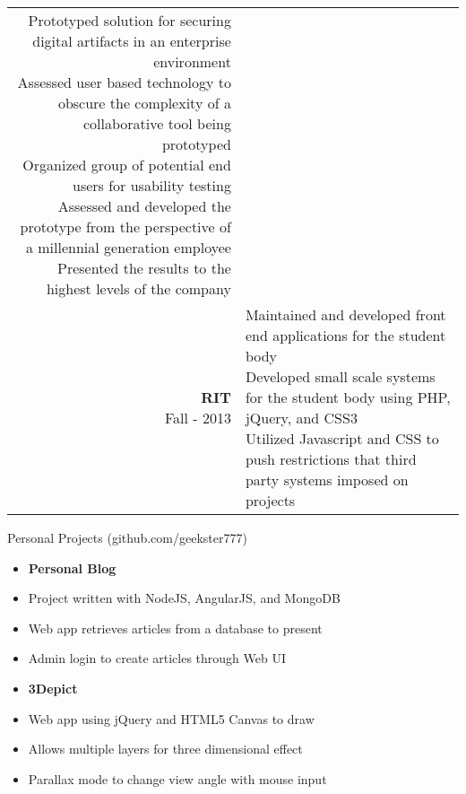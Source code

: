 \documentclass{article}
\makeatletter
\newcommand{\lineseparator}[1]{\noindent\makebox[\linewidth]{\rule{\textwidth}{#1}}}
\newcommand*\lineBr[2][c]{\begin{tabular}[#1]{@{}r@{}}#2\end{tabular}}
\newcommand*\lineBl[2][c]{\begin{tabular}[#1]{@{}l@{}}#2\end{tabular}}
\makeatother
\begin{document}
\begin{tabularx}{\textwidth}{ r | X }
{    Prototyped solution for securing digital artifacts in an enterprise environment\\[2mm]
    Assessed user based technology to obscure the complexity of a collaborative tool being prototyped \\[2mm]
    Organized group of potential end users for usability testing \\[2mm]
    Assessed and developed the prototype from the perspective of a millennial generation employee \\[2mm]
    Presented the results to the highest levels of the company 
  } \\
  \vspace{4mm}
  \lineBr{ {\large {\bf RIT }\\[2mm]Fall - 2013}} &
  \lineBl{
    Maintained and developed front end applications for the student body \\[2mm]
    Developed small scale systems for the student body using PHP, jQuery, and CSS3 \\[2mm]
    Utilized Javascript and CSS to push restrictions that third party systems imposed on projects 
  }
\end{tabularx}
{\Large Personal Projects (github.com/geekster777) } \\ 
\lineseparator{0.5pt}
\vspace{4mm}
\begin{minipage}[t]{0.5\textwidth}
  \vspace{0.5mm}
  \begin{itemize}[leftmargin=4mm]
    \item[] {\bf Personal Blog } \\[-0.5mm]   
    \item[] Project written with NodeJS, AngularJS, and MongoDB \\[-2mm]   
    \item[] Web app retrieves articles from a database to present \\[-2mm]   
    \item[] Admin login to create articles through Web UI \\[2mm]
    \item[] {\bf 3Depict } \\[-0.5mm]   
    \item[] Web app using jQuery and HTML5 Canvas to draw \\[-2mm]   
    \item[] Allows multiple layers for three dimensional effect \\[-2mm]   
    \item[] Parallax mode to change view angle with mouse input 
  \end{itemize}
\end{minipage}
\end{document}
